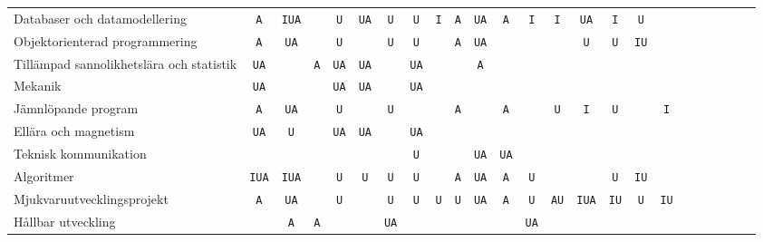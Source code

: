 \begin{sidewaystable}[H]
{\begin{tabular}{lccccccccccccccccccccccc}
Databaser och datamodellering            & \texttt{A}   & \texttt{IUA} &     & \texttt{U}   & \texttt{UA}  & \texttt{U}   & \texttt{U}   & \texttt{I}   & \texttt{A}   & \texttt{UA}  & \texttt{A}   & \texttt{I}   & \texttt{I}   & \texttt{UA}  & \texttt{I}   & \texttt{U}   &     &     &     &     &     &     &     \tabularnewline
Objektorienterad programmering          & \texttt{A}   & \texttt{UA}  &     & \texttt{U}   &     & \texttt{U}   & \texttt{U}   &     & \texttt{A}   & \texttt{UA}  &     &     &     & \texttt{U}   & \texttt{U}   & \texttt{IU}  &     &     &     &     &     &     &     \tabularnewline
Tillämpad sannolikhetslära och statistik & \texttt{UA}  &     & \texttt{A}   & \texttt{UA}  & \texttt{UA}  &     & \texttt{UA}  &     &     & \texttt{A}   &     &     &     &     &     &     &     &     &     &     &     &     &     \tabularnewline
Mekanik                                  & \texttt{UA}  &     &     & \texttt{UA}  & \texttt{UA}  &     & \texttt{UA}  &     &     &     &     &     &     &     &     &     &     &     &     &     &     &     &     \tabularnewline
\midrule
Jämnlöpande program                      & \texttt{A}   & \texttt{UA}  &     & \texttt{U}   &     & \texttt{U}   &     &     & \texttt{A}   &     & \texttt{A}   &     & \texttt{U}   & \texttt{I}   & \texttt{U}   &     & \texttt{I}   &     &     &     &     &     &     \tabularnewline
Ellära och magnetism                     & \texttt{UA}  & \texttt{U}   &     & \texttt{UA}  & \texttt{UA}  &     & \texttt{UA}  &     &     &     &     &     &     &     &     &     &     &     &     &     &     &     &     \tabularnewline
Teknisk kommunikation                    &     &     &     &     &     &     & \texttt{U}   &     &     & \texttt{UA}  & \texttt{UA}  &     &     &     &     &     &     &     &     &     &     &     &     \tabularnewline
Algoritmer                               & \texttt{IUA} & \texttt{IUA} &     & \texttt{U}   & \texttt{U}   & \texttt{U}   & \texttt{U}   &     & \texttt{A}   & \texttt{UA}  & \texttt{A}   & \texttt{U}   &     &     & \texttt{U}   & \texttt{IU}  &     &     &     &     &     &     &     \tabularnewline
Mjukvaruutvecklingsprojekt               & \texttt{A}   & \texttt{UA}  &     & \texttt{U}   &     & \texttt{U}   & \texttt{U}   & \texttt{U}   & \texttt{U}   & \texttt{UA}  & \texttt{A}   & \texttt{U}   & \texttt{AU}  & \texttt{IUA} & \texttt{IU}  & \texttt{U}   & \texttt{IU}  &     &     &     &     &     &     \tabularnewline
Hållbar utveckling                       &     & \texttt{A}   & \texttt{A}   &     &     & \texttt{UA}  &     &     &     &     &     & \texttt{UA}  &     &     &     &     &     &     &     &     &     &     &     \tabularnewline

\end{tabular}}
\end{sidewaystable}

